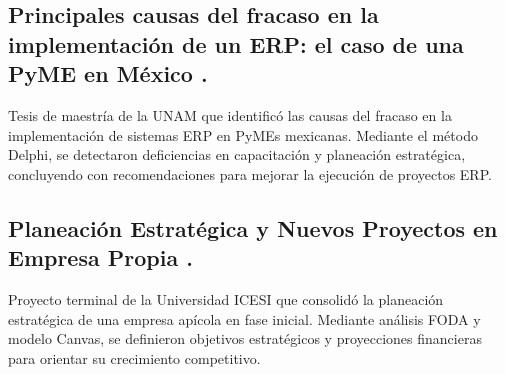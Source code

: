 \subsection{Principales causas del fracaso en la implementación de un ERP: el caso de una PyME en México \cite{Delgado2015}.}

Tesis de maestría de la UNAM que identificó las causas del fracaso en la implementación de sistemas ERP en PyMEs mexicanas. Mediante el método Delphi, se detectaron deficiencias en capacitación y planeación estratégica, concluyendo con recomendaciones para mejorar la ejecución de proyectos ERP.

\subsection{Planeación Estratégica y Nuevos Proyectos en Empresa Propia \cite{Patino19}.}

Proyecto terminal de la Universidad ICESI que consolidó la planeación estratégica de una empresa apícola en fase inicial. Mediante análisis FODA y modelo Canvas, se definieron objetivos estratégicos y proyecciones financieras para orientar su crecimiento competitivo.


